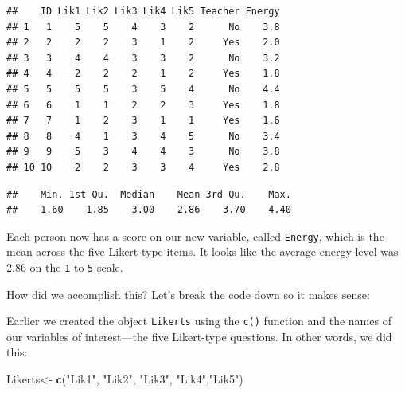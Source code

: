 \documentclass[]{tufte-handout}
\newenvironment{Shaded}{}{}
\newcommand{\CommentTok}[1]{\textcolor[rgb]{0.38,0.63,0.69}{\textit{#1}}}
\newcommand{\DataTypeTok}[1]{\textcolor[rgb]{0.56,0.13,0.00}{#1}}
\newcommand{\DecValTok}[1]{\textcolor[rgb]{0.25,0.63,0.44}{#1}}
\newcommand{\KeywordTok}[1]{\textcolor[rgb]{0.00,0.44,0.13}{\textbf{#1}}}
\newcommand{\NormalTok}[1]{#1}
\newcommand{\OperatorTok}[1]{\textcolor[rgb]{0.40,0.40,0.40}{#1}}
\newcommand{\StringTok}[1]{\textcolor[rgb]{0.25,0.44,0.63}{#1}}
\begin{document}
\begin{Shaded}
\end{Shaded}

\begin{verbatim}
##    ID Lik1 Lik2 Lik3 Lik4 Lik5 Teacher Energy
## 1   1    5    5    4    3    2      No    3.8
## 2   2    2    2    3    1    2     Yes    2.0
## 3   3    4    4    3    3    2      No    3.2
## 4   4    2    2    2    1    2     Yes    1.8
## 5   5    5    5    3    5    4      No    4.4
## 6   6    1    1    2    2    3     Yes    1.8
## 7   7    1    2    3    1    1     Yes    1.6
## 8   8    4    1    3    4    5      No    3.4
## 9   9    5    3    4    4    3      No    3.8
## 10 10    2    2    3    3    4     Yes    2.8
\end{verbatim}

\begin{Shaded}
\end{Shaded}

\begin{verbatim}
##    Min. 1st Qu.  Median    Mean 3rd Qu.    Max. 
##    1.60    1.85    3.00    2.86    3.70    4.40
\end{verbatim}

Each person now has a score on our new variable, called \texttt{Energy},
which is the mean across the five Likert-type items. It looks like the
average energy level was 2.86 on the \texttt{1} to \texttt{5} scale.

How did we accomplish this? Let's break the code down so it makes sense:

Earlier we created the object \texttt{Likerts} using the \texttt{c()}
function and the names of our variables of interest---the five
Likert-type questions. In other words, we did this:

\begin{Shaded}
\begin{Highlighting}[]
\NormalTok{Likerts<-}\StringTok{ }\KeywordTok{c}\NormalTok{(}\StringTok{"Lik1"}\NormalTok{, }\StringTok{"Lik2"}\NormalTok{, }\StringTok{"Lik3"}\NormalTok{, }\StringTok{"Lik4"}\NormalTok{,}\StringTok{"Lik5"}\NormalTok{)}
\end{Highlighting}
\end{Shaded}
\end{document}

